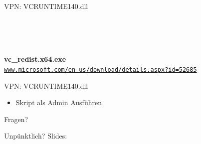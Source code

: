 \documentclass[10pt]{beamer}
\newcommand\urls[1]{%
  \href{https://#1}{\nolinkurl{#1}}%
}
\begin{document}
\begin{frame}{VPN: VCRUNTIME140.dll}
    \begin{figure}
        \centering
    \end{figure}
    \\~\\~

    \large
    \textbf{vc\_redist.x64.exe}\\
    \urls{www.microsoft.com/en-us/download/details.aspx?id=52685}
\end{frame}

\begin{frame}{VPN: VCRUNTIME140.dll}
    
    \begin{itemize}
        \item Skript als Admin Ausführen
    \end{itemize}
\end{frame}


\begin{frame}[standout]
  Fragen?
\end{frame}

{

    \begin{frame}[label=unpuenktlich]{Unpünktlich?}
        \centering\Large
        Slides:\\~\\
    \end{frame}
}
\end{document}
